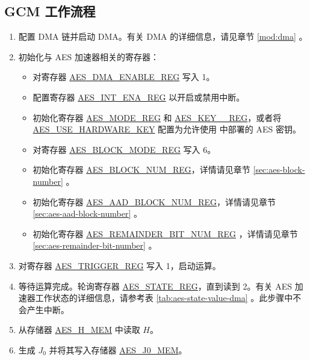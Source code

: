 \documentclass[main\_\_CN.tex]{subfiles}
\begin{document}
\subsection{GCM 工作流程}

\begin{enumerate}
    \item 配置 DMA 链并启动 DMA。有关 DMA 的详细信息，请见章节 \ref{mod:dma} \textit{}。
    \item 初始化与 AES 加速器相关的寄存器：
    \begin{itemize}
        \item 对寄存器 \hyperref[regdesc:AESDMAENABLEREG]{AES\_DMA\_ENABLE\_REG} 写入 1。
        \item 配置寄存器 \hyperref[regdesc:AESINTENAREG]{AES\_INT\_ENA\_REG} 以开启或禁用中断。
        \item 初始化寄存器  \hyperref[regdesc:AESMODEREG]{AES\_MODE\_REG} 和 \hyperref[regdesc:AESKEYNREG]{AES\_KEY\_\_REG}，或者将 \hyperref[fielddesc:AESUSEHARDWAREKEY]{AES\_USE\_HARDWARE\_KEY} 配置为允许使用  中部署的 AES 密钥。
        \item 对寄存器 \hyperref[regdesc:AESBLOCKMODEREG]{AES\_BLOCK\_MODE\_REG} 写入 6。
        \item 初始化寄存器 \hyperref[regdesc:AESBLOCKNUMREG]{AES\_BLOCK\_NUM\_REG}，详情请见章节 \ref{sec:aes-block-number} \textit{}。
        \item 初始化寄存器 \hyperref[regdesc:AESAADBLOCKNUMREG]{AES\_AAD\_BLOCK\_NUM\_REG}，详情请见章节 \ref{sec:aes-aad-block-number} \textit{}。
        \item 初始化寄存器 \hyperref[regdesc:AESREMAINDERBITNUMREG]{AES\_REMAINDER\_BIT\_NUM\_REG} ，详情请见章节 \ref{sec:aes-remainder-bit-number} \textit{}。
    \end{itemize}
    \item 对寄存器 \hyperref[regdesc:AESTRIGGERREG]{AES\_TRIGGER\_REG} 写入 1，启动运算。
    \item 等待运算完成。轮询寄存器 \hyperref[regdesc:AESSTATEREG]{AES\_STATE\_REG}，直到读到 2。有关 AES 加速器工作状态的详细信息，请参考表 \ref{tab:aes-state-value-dma} \textit{}。此步骤中不会产生中断。
    \item 从存储器 \hyperref[memdesc:AESHMEM]{AES\_H\_MEM} 中读取 $H$。
    \item 生成 $J_0$ 并将其写入存储器 \hyperref[memdesc:AESJ0MEM]{AES\_J0\_MEM}。

\end{enumerate}
\end{document}
